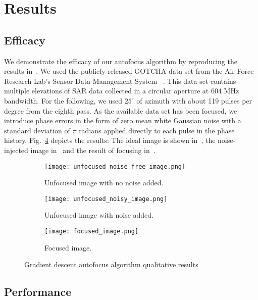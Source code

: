 \section{Results}\label{sec:results}

\subsection{Efficacy}

We demonstrate the efficacy of our autofocus algorithm by reproducing the
results in~\cite{ash2012autofocus}. We used the publicly released GOTCHA data
set from the Air Force Research Lab's Sensor Data Management System
~\cite{gotcha}. This data set contains multiple elevations of SAR data collected
in a circular aperture at 604 MHz bandwidth. For the following, we used
$25^{\circ}$ of azimuth with about 119 pulses per degree from the eighth pass.
As the available data set has been focused, we introduce phase errors in the
form of zero mean white Gaussian noise with a standard deviation of $\pi$
radians applied directly to each pulse in the phase history.
Fig.~\ref{fig:efficacy} depicts the results: The ideal image is shown
in~, the noise-injected image in~ and the
result of focusing in~.

\begin{figure}
  \centering
  \begin{subfigure}{0.5\textwidth}
    \centering
    \texttt{[image: unfocused\_noise\_free\_image.png]}
    \caption{Unfocused image with no noise added.}
    \label{fig:ideal}
  \end{subfigure}
  \vfill
  \begin{subfigure}{0.5\textwidth}
    \centering
    \texttt{[image: unfocused\_noisy\_image.png]}
    \caption{Unfocused image with noise added.}
    \label{fig:unfocused}
  \end{subfigure}
  \vfill
  \begin{subfigure}{0.5\textwidth}
    \centering
    \texttt{[image: focused\_image.png]}
    \caption{Focused image.}
    \label{fig:focused}
  \end{subfigure}
  \vspace{5 mm}
  \caption{Gradient descent autofocus algorithm qualitative results}
  \label{fig:efficacy}
\end{figure}

\subsection{Performance}

